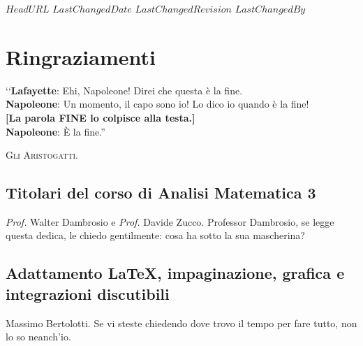 \svnidlong
{$HeadURL$}
{$LastChangedDate$}
{$LastChangedRevision$}
{$LastChangedBy$}

\chapter{Ringraziamenti}

\begin{introduction}
‘‘\textbf{Lafayette}: Ehi, Napoleone! Direi che questa è la fine.\\
\textbf{Napoleone}: Un momento, il capo sono io! Lo dico io quando è la fine!\\
\textbf{[La parola \textsf{FINE} lo colpisce alla testa.]}\\
\textbf{Napoleone}: È la fine.''
\begin{flushright}
	\textsc{Gli Aristogatti.}
\end{flushright}
\end{introduction}

\section*{Titolari del corso di Analisi Matematica 3}

\textit{Prof.} Walter Dambrosio e \textit{Prof.} Davide Zucco. Professor Dambrosio, se legge questa dedica, le chiedo gentilmente: cosa ha sotto la sua mascherina?

\section*{Adattamento \LaTeX, impaginazione, grafica e integrazioni discutibili}
Massimo Bertolotti. Se vi steste chiedendo dove trovo il tempo per fare tutto, non lo so neanch'io.


